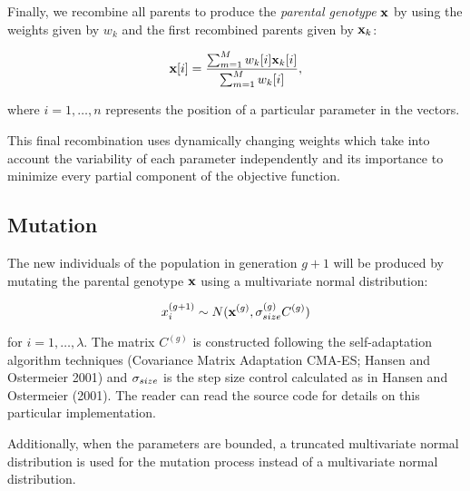 Finally, we recombine all parents to produce the \emph{parental genotype} $\textbf{x}$ by using the weights given by $w_k$ and the first recombined parents given by $\textbf{x}_k$:

\begin{equation}
\textbf{x}[i] = \frac{\sum_{m=1}^M w_k[i]\textbf{x}_k[i]}{\sum_{m=1}^M w_k[i]},
\label{eq-final_recombination}
\end{equation}

\noindent where $i=1, \dots, n$ represents the position of a particular parameter in the vectors.

This final recombination uses dynamically changing weights which take into account the variability of each parameter independently and its importance to minimize every partial component of the objective function.  

\subsection{Mutation}

The new individuals of the population in generation $g+1$ will be produced by mutating the parental genotype $\textbf{x}$ using a multivariate normal distribution:

\begin{equation}
x_i^{(g+1)} \sim N(\textbf{x}^{(g)}, \sigma_{size}^{(g)}C^{(g)})
\end{equation}

\noindent for $i=1, \dots, \lambda$. The matrix $C^{(g)}$ is constructed following the self-adaptation algorithm techniques (Covariance Matrix Adaptation CMA-ES; Hansen and Ostermeier 2001) and $\sigma_{size}$ is the step size control calculated as in  
Hansen and Ostermeier (2001). The reader can read the source code for details on this particular implementation.

Additionally, when the parameters are bounded, a truncated multivariate normal distribution is used for the mutation process instead of a multivariate normal distribution. 

